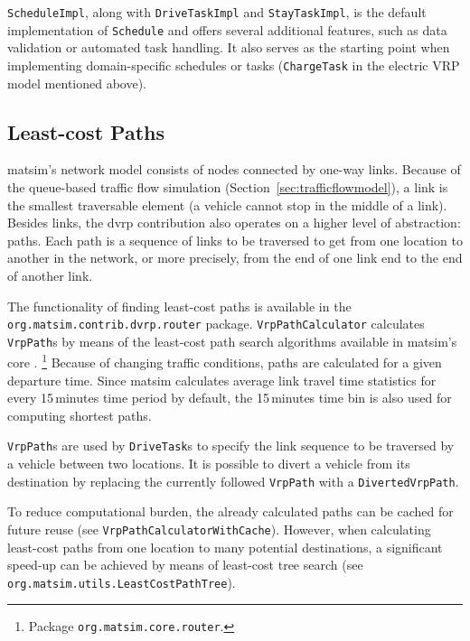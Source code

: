 \lstinline$ScheduleImpl$, along with \lstinline$DriveTaskImpl$ and \lstinline$StayTaskImpl$, is the default implementation of \lstinline$Schedule$ and offers several additional features, such as data validation or automated task handling. It also serves as the starting point when implementing domain-specific schedules or tasks (\eg \lstinline$ChargeTask$ in the electric VRP model mentioned above).

\subsection{Least-cost Paths}
\label{sec:VRP-router}

\gls{matsim}'s network model consists of nodes connected by one-way links. Because of the queue-based traffic flow simulation (Section~\ref{sec:trafficflowmodel}), a link is the smallest traversable element (\ie a vehicle cannot stop in the middle of a link). Besides links, the \gls{dvrp} contribution also operates on a higher level of abstraction: paths. Each path is a sequence of links to be traversed to get from one location to another in the network, or more precisely, from the end of one link end to the end of another link. 

The functionality of finding least-cost paths is available in the \lstinline$org.matsim.contrib.dvrp.router$ package. \lstinline$VrpPathCalculator$ calculates \lstinline$VrpPath$s by means of the least-cost path search algorithms available in \gls{matsim}'s core
\citep{JacobMaratheEtAl1999computationalstudyof,LefebvreBalmer_unpub_STRC_2007}.%
\footnote{
Package \lstinline$org.matsim.core.router$.
}
Because of changing traffic conditions, paths are calculated for a given departure time. Since \gls{matsim} calculates average link travel time statistics for every 15\,minutes time period by default, the 15\,minutes time bin is also used for computing shortest paths.

\lstinline$VrpPath$s are used by \lstinline$DriveTask$s to specify the link sequence to be traversed by a vehicle between two locations. It is possible to divert a vehicle from its destination by replacing the currently followed \lstinline$VrpPath$ with a \lstinline$DivertedVrpPath$.

To reduce computational burden, the already calculated paths can be cached for future reuse (see \lstinline$VrpPathCalculatorWithCache$). However, when calculating least-cost paths from one location to many potential destinations, a significant speed-up can be achieved by means of least-cost tree search (see \lstinline$org.matsim.utils.LeastCostPathTree$).

